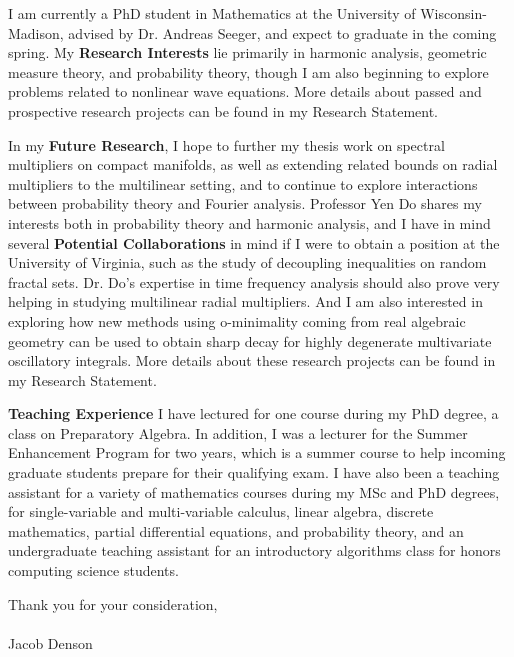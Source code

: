 \documentclass[11pt,stdletter,orderfromtodate,sigleft]{newlfm}
\begin{document}
\begin{newlfm}

I am currently a PhD student in Mathematics at the University of Wisconsin-Madison, advised by Dr. Andreas Seeger, and expect to graduate in the coming spring. My {\bf Research Interests} lie primarily in harmonic analysis, geometric measure theory, and probability theory, though I am also beginning to explore problems related to nonlinear wave equations. More details about passed and prospective research projects can be found in my Research Statement.

In my {\bf Future Research}, I hope to further my thesis work on spectral multipliers on compact manifolds, as well as extending related bounds on radial multipliers to the multilinear setting, and to continue to explore interactions between probability theory and Fourier analysis. Professor Yen Do shares my interests both in probability theory and harmonic analysis, and I have in mind several {\bf Potential Collaborations} in mind if I were to obtain a position at the University of Virginia, such as the study of decoupling inequalities on random fractal sets. Dr. Do's expertise in time frequency analysis should also prove very helping in studying multilinear radial multipliers. And I am also interested in exploring how new methods using o-minimality coming from real algebraic geometry can be used to obtain sharp decay for highly degenerate multivariate oscillatory integrals. More details about these research projects can be found in my Research Statement.

{\bf Teaching Experience} I have lectured for one course during my PhD degree, a class on Preparatory Algebra. In addition, I was a lecturer for the Summer Enhancement Program for two years, which is a summer course to help incoming graduate students prepare for their qualifying exam. I have also been a teaching assistant for a variety of mathematics courses during my MSc and PhD degrees, for single-variable and multi-variable calculus, linear algebra, discrete mathematics, partial differential equations, and probability theory, and an undergraduate teaching assistant for an introductory algorithms class for honors computing science students.

Thank you for your consideration,\\\\
Jacob Denson

\end{newlfm}
\end{document}
